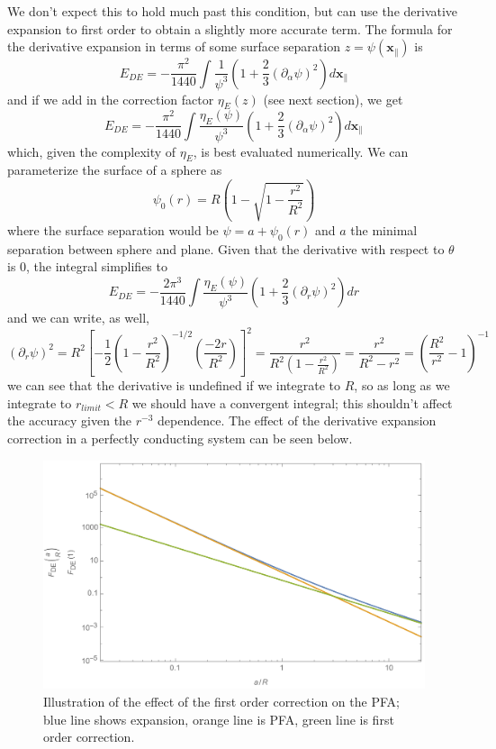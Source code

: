\documentclass[11pt]{article}
\begin{document}
We don't expect this to hold much past this condition, but can use the derivative expansion to first order to obtain a slightly more accurate term. The formula for the derivative expansion in terms of some surface separation $z=\psi(\mathbf{x}_\parallel)$ is
$$
E_{DE}=-\frac{\pi^2}{1440}\int\frac{1}{\psi^3}\left(1+\frac{2}{3}(\partial_\alpha \psi)^2\right)d\mathbf{x}_\parallel
$$
and if we add in the correction factor $\eta_E(z)$ (see next section), we get
$$
E_{DE}=-\frac{\pi^2}{1440}\int\frac{\eta_E(\psi)}{\psi^3}\left(1+\frac{2}{3}(\partial_\alpha \psi)^2\right)d\mathbf{x}_\parallel
$$
which, given the complexity of $\eta_E$, is best evaluated numerically. We can parameterize the surface of a sphere as
$$
\psi_0(r)=R\left(1-\sqrt{1-\frac{r^2}{R^2}}\right)
$$
where the surface separation would be $\psi=a+\psi_0(r)$ and $a$ the minimal separation between sphere and plane. Given that the derivative with respect to $\theta$ is 0, the integral simplifies to
$$
E_{DE}=-\frac{2\pi^3}{1440}\int\frac{\eta_E(\psi)}{\psi^3}\left(1+\frac{2}{3}(\partial_r \psi)^2\right)dr
$$
and we can write, as well, 
$$
(\partial_r\psi)^2=R^2\left[-\frac{1}{2}\left(1-\frac{r^2}{R^2}\right)^{-1/2}\left(\frac{-2r}{R^2}\right)\right]^2=\frac{r^2}{R^2(1-\frac{r^2}{R^2})}=\frac{r^2}{R^2-r^2}=\left(\frac{R^2}{r^2}-1\right)^{-1}
$$
we can see that the derivative is undefined if we integrate to $R$, so as long as we integrate to $r_{limit}<R$ we should have a convergent integral; this shouldn't affect the accuracy given the $r^{-3}$ dependence. The effect of the derivative expansion correction in a perfectly conducting system can be seen below.

\begin{figure}[h]
\centering
\includegraphics[width=5in]{PFAExpansion}
\caption{Illustration of the effect of the first order correction on the PFA; blue line shows expansion, orange line is PFA, green line is first order correction.}\label{fig:expansion}
\end{figure}
\end{document}
